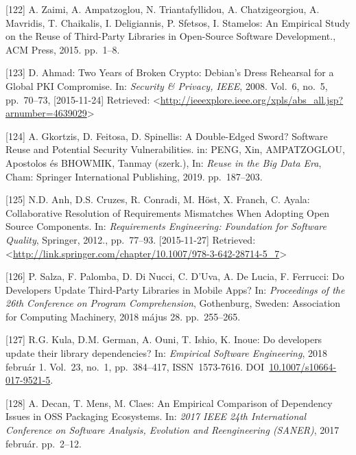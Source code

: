 \documentclass[12pt,magyar,a4paper,oneside]{scrreprt}
\newenvironment{cslreferences}%
  {}%
  {\par}
\begin{document}
\begin{cslreferences}
\leavevmode\hypertarget{ref-zaimi_empirical_2015}{}%
{[}122{]} A. Zaimi, A. Ampatzoglou, N. Triantafyllidou, A.
Chatzigeorgiou, A. Mavridis, T. Chaikalis, I. Deligiannis, P. Sfetsos,
I. Stamelos: An Empirical Study on the Reuse of Third-Party Libraries in
Open-Source Software Development., ACM Press, 2015. pp.~1--8.

\leavevmode\hypertarget{ref-ahmad_two_2008}{}%
{[}123{]} D. Ahmad: Two Years of Broken Crypto: Debian's Dress Rehearsal
for a Global PKI Compromise. In: \emph{Security \& Privacy, IEEE}, 2008.
Vol.~6, no.~5, pp.~70--73, {[}2015-11-24{]} Retrieved:
\textless{}\url{http://ieeexplore.ieee.org/xpls/abs_all.jsp?arnumber=4639029}\textgreater{}

\leavevmode\hypertarget{ref-gkortzis_double-edged_2019}{}%
{[}124{]} A. Gkortzis, D. Feitosa, D. Spinellis: A Double-Edged Sword?
Software Reuse and Potential Security Vulnerabilities. in: PENG, Xin,
AMPATZOGLOU, Apostolos és BHOWMIK, Tanmay (szerk.), In: \emph{Reuse in
the Big Data Era}, Cham: Springer International Publishing, 2019.
pp.~187--203.

\leavevmode\hypertarget{ref-anh_collaborative_2012}{}%
{[}125{]} N.D. Anh, D.S. Cruzes, R. Conradi, M. Höst, X. Franch, C.
Ayala: Collaborative Resolution of Requirements Mismatches When Adopting
Open Source Components. In: \emph{Requirements Engineering: Foundation
for Software Quality}, Springer, 2012., pp.~77--93. {[}2015-11-27{]}
Retrieved:
\textless{}\url{http://link.springer.com/chapter/10.1007/978-3-642-28714-5_7}\textgreater{}

\leavevmode\hypertarget{ref-salza_developers_2018}{}%
{[}126{]} P. Salza, F. Palomba, D. Di Nucci, C. D'Uva, A. De Lucia, F.
Ferrucci: Do Developers Update Third-Party Libraries in Mobile Apps? In:
\emph{Proceedings of the 26th Conference on Program Comprehension},
Gothenburg, Sweden: Association for Computing Machinery, 2018 május 28.
pp.~255--265.

\leavevmode\hypertarget{ref-kula_developers_2018}{}%
{[}127{]} R.G. Kula, D.M. German, A. Ouni, T. Ishio, K. Inoue: Do
developers update their library dependencies? In: \emph{Empirical
Software Engineering}, 2018 február 1. Vol.~23, no.~1, pp.~384--417,
ISSN~1573-7616.
DOI~\href{https://doi.org/10.1007/s10664-017-9521-5}{10.1007/s10664-017-9521-5}.

\leavevmode\hypertarget{ref-decan_empirical_2017}{}%
{[}128{]} A. Decan, T. Mens, M. Claes: An Empirical Comparison of
Dependency Issues in OSS Packaging Ecosystems. In: \emph{2017 IEEE 24th
International Conference on Software Analysis, Evolution and
Reengineering (SANER)}, 2017 február. pp.~2--12.


\end{cslreferences}
\end{document}
